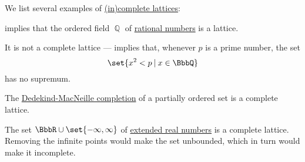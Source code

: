 \begin{proposition}\label{ex:def:complete_lattice}
  We list several examples of \hyperref[def:complete_lattice]{(in)complete lattices}:
  \begin{thmenum}
      implies that the ordered field \( \BbbQ \) of \hyperref[def:rational_numbers]{rational numbers} is a lattice.

    It is not a complete lattice ---  implies that, whenever \( p \) is a prime number, the set
    \begin{equation*}
      \set{ x^2 < p \given x \in \BbbQ }
    \end{equation*}
    has no supremum.

     The \hyperref[def:dedekind_macnielle_completion]{Dedekind-MacNeille completion} of a partially ordered set is a complete lattice.

     The set \( \BbbR \cup \set{ -\infty, \infty } \) of \hyperref[def:extended_real_numbers]{extended real numbers} is a complete lattice. Removing the infinite points would make the set unbounded, which in turn would make it incomplete.
  \end{thmenum}
\end{proposition}


